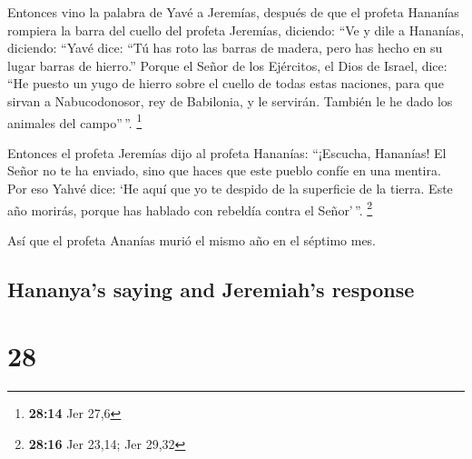 \begin{paracol}{2}
 Entonces vino la palabra de Yavé a Jeremías, después de
que el profeta Hananías rompiera la barra del cuello del profeta
Jeremías, diciendo:  ``Ve y dile a Hananías, diciendo:
``Yavé dice: ``Tú has roto las barras de madera, pero has hecho en su
lugar barras de hierro.''  Porque el Señor de los
Ejércitos, el Dios de Israel, dice: ``He puesto un yugo de hierro sobre
el cuello de todas estas naciones, para que sirvan a Nabucodonosor, rey
de Babilonia, y le servirán. También le he dado los animales del
campo''\,''. \footnote{\textbf{28:14} Jer 27,6}

 Entonces el profeta Jeremías dijo al profeta Hananías:
``¡Escucha, Hananías! El Señor no te ha enviado, sino que haces que este
pueblo confíe en una mentira.  Por eso Yahvé dice: `He
aquí que yo te despido de la superficie de la tierra. Este año morirás,
porque has hablado con rebeldía contra el Señor'\,''. \footnote{\textbf{28:16}
  Jer 23,14; Jer 29,32}

 Así que el profeta Ananías murió el mismo año en el
séptimo mes.

\switchcolumn
\begin{otherlanguage}{english}

\hypertarget{hananyas-saying-and-jeremiahs-response}{%
\subsection{Hananya's saying and Jeremiah's
response}\label{hananyas-saying-and-jeremiahs-response}}

\hypertarget{section-55}{%
\section{28}\label{section-55}}


\end{otherlanguage}
\end{paracol}
